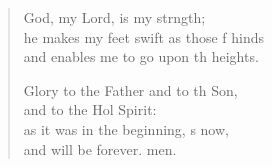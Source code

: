 \begin{verse}
\begin{patverse}
God, my Lord, is my strngth;\Flex\\
he makes my feet swift as those f hinds\Med\\
and enables me to go upon th heights.

Glory to the Father and to th Son,\Med\\
and to the Hol Spirit:\\
as it was in the beginning, \pointup{\i}s now,\Med\\
and will be forever. men. 
  \end{patverse}
\end{verse}
